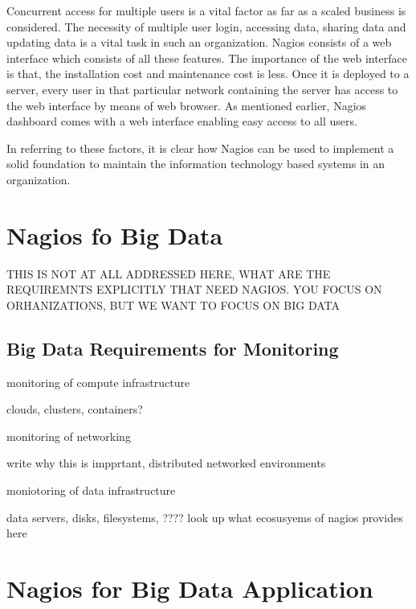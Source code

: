 \documentclass[9pt,twocolumn,twoside]{styles/osajnl}
\begin{document}
Concurrent access for multiple users is a vital factor as far as
a scaled business is considered. The necessity of multiple user login,
accessing data, sharing data and updating data is a vital task in such
an organization. Nagios consists of a web interface which consists of
all these features. The importance of the web interface is that,
the installation cost and maintenance cost is less. Once it is deployed
to a server, every user in that particular network containing the server
has access to the web interface by means of web browser. As mentioned earlier,
Nagios dashboard comes with a web interface enabling easy access to all users.

In referring to these factors, it is clear how Nagios can be used to
implement a solid foundation to maintain the information technology
based systems in an organization.

\section{Nagios fo Big Data}

THIS IS NOT AT ALL ADDRESSED HERE, WHAT ARE THE REQUIREMNTS EXPLICITLY
THAT NEED NAGIOS. YOU FOCUS ON ORHANIZATIONS, BUT WE WANT TO FOCUS ON
BIG DATA

\subsection{Big Data Requirements for Monitoring}

monitoring of compute infrastructure

   clouds, clusters, containers?

monitoring of networking 

    write why this is impprtant, distributed networked environments

moniotoring of data infrastructure

   data servers, disks, filesystems, ???? look up what ecosusyems of
   nagios provides here


\section{Nagios for Big Data Application}
\end{document}
